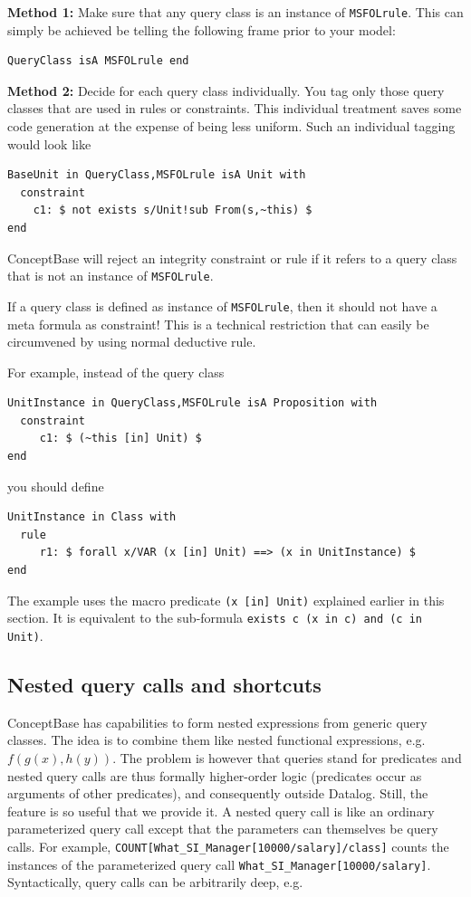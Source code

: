 {\bf Method 1: }Make sure that any query class is an instance of {\tt MSFOLrule}.
This can simply be achieved be telling the following frame prior to your model:

{\small
\begin{verbatim}
QueryClass isA MSFOLrule end
\end{verbatim}
}


{\bf Method 2: } Decide for each query class individually.
You tag only those query classes that are used in rules or
constraints. This individual treatment saves some code generation at
the expense of being less uniform.
Such an individual tagging would look like

{\small
\begin{verbatim}
BaseUnit in QueryClass,MSFOLrule isA Unit with
  constraint
    c1: $ not exists s/Unit!sub From(s,~this) $
end
\end{verbatim}
}

ConceptBase will reject an integrity constraint or rule if it refers to
a query class that is not an instance of {\tt MSFOLrule}.

If a query class is defined as instance of {\tt MSFOLrule}, then it should not
have a meta formula as constraint! This is a technical restriction that can
easily be circumvened by using normal deductive rule.

For example, instead of the query class 

{\small
\begin{verbatim}
UnitInstance in QueryClass,MSFOLrule isA Proposition with
  constraint
     c1: $ (~this [in] Unit) $
end
\end{verbatim}
}

you should define

{\small
\begin{verbatim}
UnitInstance in Class with
  rule
     r1: $ forall x/VAR (x [in] Unit) ==> (x in UnitInstance) $
end
\end{verbatim}
}

The example uses the macro predicate {\tt (x [in] Unit)} explained earlier in this section. 
It is equivalent to the sub-formula {\tt exists c (x in c) and (c in Unit)}.



\subsection{Nested query calls and shortcuts} \label{sec:cqc}

ConceptBase has capabilities to form nested expressions from
generic query classes. The idea is to combine them like nested
functional expressions, e.g. $f(g(x),h(y))$.
The problem is however that queries stand for predicates and
nested query calls are thus formally higher-order logic
(predicates occur as arguments of other predicates),
and consequently outside Datalog. Still, the feature is so useful
that we provide it. A nested query call is like an ordinary
parameterized query call except that the parameters can themselves be
query calls. For example, {\tt COUNT[What\_SI\_Manager[10000/salary]/class]}
counts the instances of the parameterized query call
{\tt What\_SI\_Manager[10000/salary]}.
Syntactically, query calls can be arbitrarily deep, e.g.

